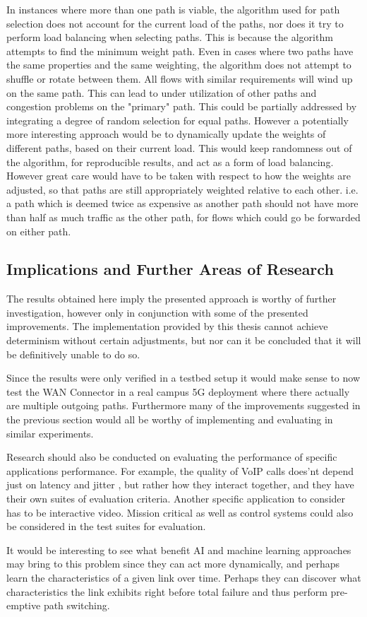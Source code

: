 In instances where more than one path is viable, the algorithm used for path selection does not account for the current load of the paths, nor does it try to perform load balancing when selecting paths. This is because the algorithm attempts to find the minimum weight path. Even in cases where two paths have the same properties and the same weighting, the algorithm does not attempt to shuffle or rotate between them. All flows with similar requirements will wind up on the same path. This can lead to under utilization of other paths and congestion problems on the "primary" path. This could be partially addressed by integrating a degree of random selection for equal paths. However a potentially more interesting approach would be to dynamically update the weights of different paths, based on their current load. This would keep randomness out of the algorithm, for reproducible results, and act as a form of load balancing. However great care would have to be taken with respect to how the weights are adjusted, so that paths are still appropriately weighted relative to each other. i.e. a path which is deemed twice as expensive as another path should not have more than half as much traffic as the other path, for flows which could go be forwarded on either path.


\subsection{Implications and Further Areas of Research}

The results obtained here imply the presented approach is worthy of further investigation, however only in conjunction with some of the presented improvements. The implementation provided by this thesis cannot achieve determinism without certain adjustments, but nor can it be concluded that it will be definitively unable to do so.

Since the results were only verified in a testbed setup it would make sense to now test the WAN Connector in a real campus 5G deployment where there actually are multiple outgoing paths. Furthermore many of the improvements suggested in the previous section would all be worthy of implementing and evaluating in similar experiments.

Research should also be conducted on evaluating the performance of specific applications performance. For example, the quality of VoIP calls does'nt depend just on latency and jitter \cite{tao2005improving}, but rather how they interact together, and they have their own suites of evaluation criteria. Another specific application to consider has to be interactive video. Mission critical as well as control systems could also be considered in the test suites for evaluation.

It would be interesting to see what benefit AI and machine learning approaches may bring to this problem since they can act more dynamically, and perhaps learn the characteristics of a given link over time. Perhaps they can discover what characteristics the link exhibits right before total failure and thus perform pre-emptive path switching.
